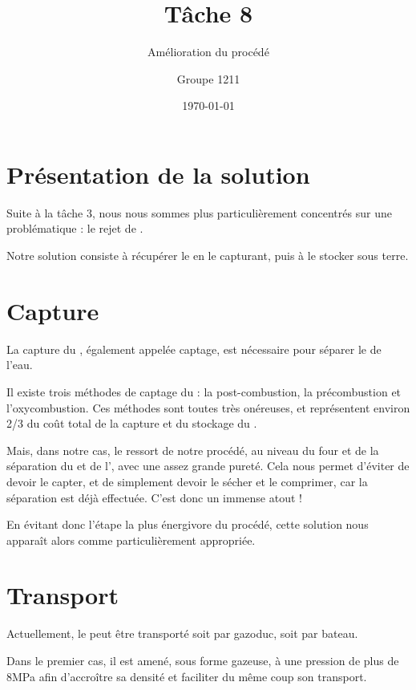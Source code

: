 \documentclass[a4, oneside, headings=normal]{scrartcl}
\begin{document}
\titlehead{}
\subject{}
\title{Tâche 8}
\subtitle{Amélioration du procédé}
\author{Groupe 1211}
\publishers{}
\date{\today}

\dedication{}

\maketitle


\section{Présentation de la solution}
Suite à la tâche 3, nous nous sommes plus particulièrement concentrés sur une problématique :  le rejet de .

Notre solution consiste à récupérer le  en le capturant, puis à le stocker sous terre. 


\section{Capture}
La capture du , également appelée captage, est nécessaire pour séparer le  de l'eau. \cite{giec} \cite{greenfacts} \cite{total} \cite{book1} \cite{book2}
 

Il existe trois méthodes de captage du  : la post-combustion, la précombustion et l'oxycombustion. Ces méthodes sont toutes très onéreuses, et représentent environ 2/3 du coût total de la capture et du stockage du .
 

Mais, dans notre cas, le  ressort de notre procédé, au niveau du four et de la séparation du  et de l', avec une assez grande pureté. Cela nous permet d'éviter de devoir le capter, et de simplement devoir le sécher et le comprimer, car la séparation est déjà effectuée. C'est donc un immense atout !
 

En évitant donc l'étape la plus énergivore du procédé, cette solution nous apparaît alors comme particulièrement appropriée.

\section{Transport}
Actuellement, le  peut être transporté soit par gazoduc, soit par bateau.
 

Dans le premier cas, il est amené, sous forme gazeuse, à une pression de plus de 8MPa afin d'accroître sa densité et faciliter du même coup son transport. 
\end{document}
